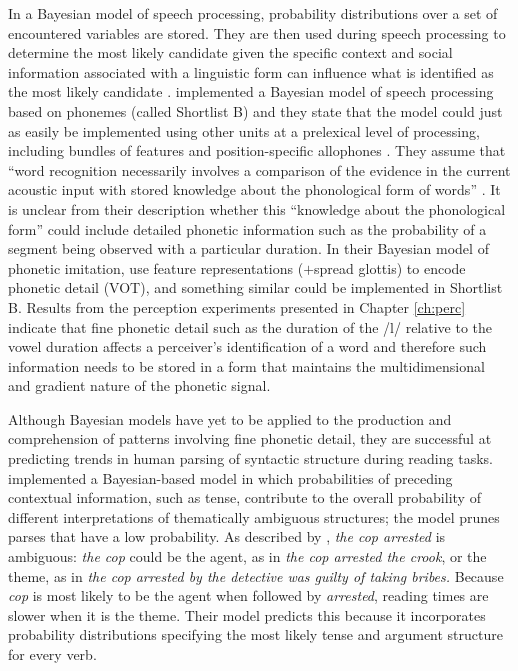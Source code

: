 In a Bayesian model of speech processing, probability distributions over a set of encountered variables are stored.  They are then used during speech processing to determine the most likely candidate given the specific context \citep{norrismcqueen2008} and social information associated with a linguistic form can influence what is identified as the most likely candidate \citep{staumcasasanto2009}.  \citet{norrismcqueen2008} implemented a Bayesian model of speech processing based on phonemes (called Shortlist B) and they state that the model could just as easily be implemented using other units at a prelexical level of processing, including bundles of features and position-specific allophones \citep[362]{norrismcqueen2008}.  They assume that ``word recognition necessarily involves a comparison of the evidence in the current acoustic input with stored knowledge about the phonological form of words'' \citep[379]{norrismcqueen2008}. It is unclear from their description whether this ``knowledge about the phonological form'' could include detailed phonetic information such as the probability of a segment being observed with a particular duration.  In their Bayesian model of phonetic imitation, \citet{nielsenwilson2008} use feature representations ($+$spread glottis) to encode phonetic detail (VOT), and something similar could be implemented in Shortlist B. Results from the perception experiments presented in Chapter \ref{ch:perc} indicate that fine phonetic detail such as the duration of the /l/ relative to the vowel duration affects a perceiver's identification of a word and therefore such information needs to be stored in a form that maintains the multidimensional and gradient nature of the phonetic signal.

Although Bayesian models have yet to be applied to the production and comprehension of patterns involving fine phonetic detail, they are successful at predicting trends in human parsing of syntactic structure during reading tasks.   \citet{narayananjurafsky1998,narayananjurafsky2002} implemented a Bayesian-based model in which probabilities of preceding contextual information, such as tense, contribute to the overall probabi\-lity of different interpretations of thematically ambiguous structures; the model prunes parses that have a low probability.  As described by \citet[59]{narayananjurafsky2002}, \textit{the cop arrested} is ambiguous: \textit{the cop} could be the agent, as in \textit{the cop arrested the crook}, or the theme, as in \textit{the cop arrested by the detective was guilty of taking bribes.}  Because \textit{cop} is most likely to be the agent when followed by \textit{arrested}, reading times are slower when it is the theme. Their model predicts this because it incorporates probability distributions specifying the most likely tense and argument structure for every verb. 
  
